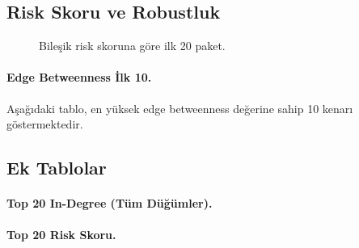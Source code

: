 \documentclass[11pt,a4paper]{article}
\begin{document}
\subsection{Risk Skoru ve Robustluk}
\begin{figure}[h]
  \centering
  \caption{Bileşik risk skoruna göre ilk 20 paket.}
\end{figure}

\paragraph{Edge Betweenness İlk 10.} Aşağıdaki tablo, en yüksek edge betweenness değerine sahip 10 kenarı göstermektedir.


\subsection{Ek Tablolar}
\paragraph{Top 20 In-Degree (Tüm Düğümler).}

\paragraph{Top 20 Risk Skoru.}
\end{document}
